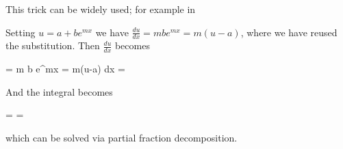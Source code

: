 This trick can be widely used; for example in

\bee
\int {}
\eee

Setting $u=a+be^{mx}$ we have $\frac{du}{dx}=mbe^{mx}=m(u-a)$, where we have reused the substitution. Then $\frac{du}{dx}$ becomes

\bee
{} = m b e^{mx} = m(u-a) \rightarrow dx = 
\eee

And the integral becomes

\bee
\int {} = \int {}  =  \int {}
\eee

which can be solved via partial fraction decomposition.
